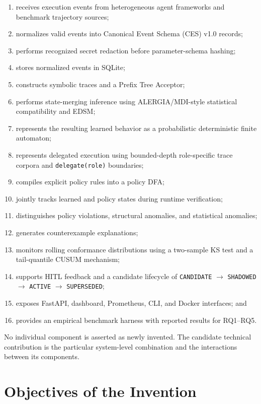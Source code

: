 \documentclass[11pt,a4paper]{article}
\begin{document}
\begin{enumerate}
\item receives execution events from heterogeneous agent frameworks and benchmark
trajectory sources;
\item normalizes valid events into Canonical Event Schema (CES) v1.0 records;
\item performs recognized secret redaction before parameter-schema hashing;
\item stores normalized events in SQLite;
\item constructs symbolic traces and a Prefix Tree Acceptor;
\item performs state-merging inference using ALERGIA/MDI-style statistical compatibility
and EDSM;
\item represents the resulting learned behavior as a probabilistic deterministic finite
automaton;
\item represents delegated execution using bounded-\allowbreak depth role-\allowbreak specific
trace corpora and \texttt{delegate(role)} boundaries;
\item compiles explicit policy rules into a policy DFA;
\item jointly tracks learned and policy states during runtime verification;
\item distinguishes policy violations, structural anomalies, and statistical anomalies;
\item generates counterexample explanations;
\item monitors rolling conformance distributions using a two-sample KS test and a
tail-quantile CUSUM mechanism;
\item supports HITL feedback and a candidate lifecycle of
\texttt{CANDIDATE} $\rightarrow$ \texttt{SHADOWED} $\rightarrow$
\texttt{ACTIVE} $\rightarrow$ \texttt{SUPERSEDED};
\item exposes FastAPI, dashboard, Prometheus, CLI, and Docker interfaces; and
\item provides an empirical benchmark harness with reported results for RQ1--RQ5.
\end{enumerate}

No individual component is asserted as newly invented. The candidate technical
contribution is the particular system-level combination and the interactions between its
components.

\section{Objectives of the Invention}
\end{document}
